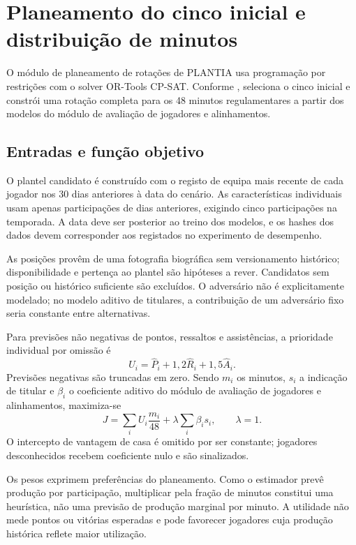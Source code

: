 \chapter{Planeamento do cinco inicial e distribuição de minutos}
\label{chap:rotacoes}

O módulo de planeamento de rotações de PLANTIA usa programação por restrições com o solver
OR-Tools CP-SAT. Conforme , seleciona
o cinco inicial e constrói uma rotação completa para os 48 minutos
regulamentares a partir dos modelos do módulo de avaliação de jogadores e alinhamentos.

\section{Entradas e função objetivo}

O plantel candidato é construído com o registo de equipa mais recente de
cada jogador nos 30 dias anteriores à data do cenário. As características
individuais usam apenas participações de dias anteriores, exigindo cinco
participações na temporada. A data deve ser posterior ao treino dos
modelos, e os hashes dos dados devem corresponder aos registados no
experimento de desempenho.

As posições provêm de uma fotografia biográfica sem versionamento
histórico; disponibilidade e pertença ao plantel são hipóteses a rever.
Candidatos sem posição ou histórico suficiente são excluídos. O adversário
não é explicitamente modelado; no modelo aditivo de titulares, a contribuição
de um adversário fixo seria constante entre alternativas.

Para previsões não negativas de pontos, ressaltos e assistências,
a prioridade individual por omissão é
\[
U_i=\widehat{P}_i+1{,}2\widehat{R}_i+1{,}5\widehat{A}_i.
\]
Previsões negativas são truncadas em zero. Sendo \(m_i\) os minutos,
\(s_i\) a indicação de titular e \(\beta_i\) o coeficiente aditivo do
módulo de avaliação de jogadores e alinhamentos, maximiza-se
\[
J=\sum_i U_i\frac{m_i}{48}+\lambda\sum_i\beta_i s_i,
\qquad \lambda=1.
\]
O intercepto de vantagem de casa é omitido por ser constante; jogadores
desconhecidos recebem coeficiente nulo e são sinalizados.

Os pesos exprimem preferências do planeamento. Como o estimador prevê
produção por participação, multiplicar pela fração de minutos constitui
uma heurística, não uma previsão de produção marginal por minuto.
A utilidade não mede pontos ou vitórias esperadas e pode favorecer
jogadores cuja produção histórica reflete maior utilização.

